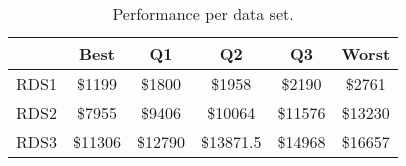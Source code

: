 \begin{table}
\footnotesize
\caption{Performance per data set.}
\centering
\begin{tabular}{c||c|c|c|c|c}
\hline \hline
                 & Best                 & Q1                 & Q2                & Q3                & Worst \\ 
\hline
RDS1 & \$1199   & \$1800   & \$1958  & \$2190  & \$2761 \\
\hline
RDS2 & \$7955   & \$9406   & \$10064  & \$11576  & \$13230 \\
\hline
RDS3 & \$11306   & \$12790   & \$13871.5  & \$14968  & \$16657 \\
\end{tabular} 
\label{table:result} 
\end{table}